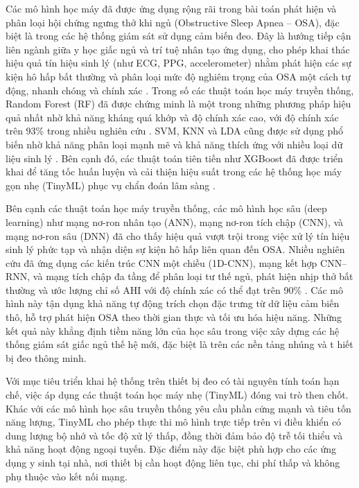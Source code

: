 Các mô hình học máy đã được ứng dụng rộng rãi trong bài toán phát hiện 
và phân loại hội chứng ngưng thở khi ngủ (Obstructive Sleep Apnea – OSA), 
đặc biệt là trong các hệ thống giám sát sử dụng cảm biến đeo. 
Đây là hướng tiếp cận liên ngành giữa y học giấc ngủ và trí tuệ nhân tạo ứng dụng, 
cho phép khai thác hiệu quả tín hiệu sinh lý (như ECG, PPG, accelerometer) 
nhằm phát hiện các sự kiện hô hấp bất thường và phân loại mức độ nghiêm trọng của 
OSA một cách tự động, nhanh chóng và chính xác \cite{osa_sanchez2025}. 
Trong số các thuật toán học máy truyền thống, Random Forest (RF) đã được chứng minh 
là một trong những phương pháp hiệu quả nhất nhờ khả năng kháng quá khớp và độ chính xác cao, 
với độ chính xác trên 93\% trong nhiều nghiên cứu \cite{genuer2020random,wang2023ml_wearable}. 
SVM, KNN và LDA cũng được sử dụng phổ biến nhờ khả năng phân loại mạnh mẽ và khả năng thích ứng 
với nhiều loại dữ liệu sinh lý \cite{cortes1995svm, cunningham2007knn, tharwat2017lda}. 
Bên cạnh đó, các thuật toán tiên tiến như XGBoost đã được triển khai để tăng tốc huấn luyện và 
cải thiện hiệu suất trong các hệ thống học máy gọn nhẹ (TinyML) 
phục vụ chẩn đoán lâm sàng \cite{chen2016xgboost}.

Bên cạnh các thuật toán học máy truyền thống, 
các mô hình học sâu (deep learning) như mạng nơ-ron nhân tạo (ANN), 
mạng nơ-ron tích chập (CNN), và mạng nơ-ron sâu (DNN) đã cho thấy hiệu quả vượt trội 
trong việc xử lý tín hiệu sinh lý phức tạp và nhận diện sự kiện hô hấp liên quan đến OSA. 
Nhiều nghiên cứu đã ứng dụng các kiến trúc CNN một chiều (1D-CNN), mạng kết hợp CNN–RNN,
và mạng tích chập đa tầng để phân loại tư thế ngủ, phát hiện nhịp thở bất thường và ước lượng chỉ 
số AHI với độ chính xác có thể đạt trên 90\% 
\cite{Vu2025SleepPosition,HOANG2025116309,Sleep_Posture_Detection}. 
Các mô hình này tận dụng khả năng tự động trích chọn đặc trưng từ dữ liệu cảm biến thô, 
hỗ trợ phát hiện OSA theo thời gian thực và tối ưu hóa hiệu năng. Những kết quả này khẳng định tiềm năng lớn của học sâu trong việc 
xây dựng các hệ thống giám sát giấc ngủ thế hệ mới, đặc biệt là trên các nền tảng nhúng và t
hiết bị đeo thông minh.

Với mục tiêu triển khai hệ thống trên thiết bị đeo có tài nguyên tính toán hạn chế, 
việc áp dụng các thuật toán học máy nhẹ (TinyML) đóng vai trò then chốt. 
Khác với các mô hình học sâu truyền thống yêu cầu phần cứng mạnh và 
tiêu tốn năng lượng, TinyML cho phép thực thi mô hình trực tiếp trên vi điều khiển 
có dung lượng bộ nhớ và tốc độ xử lý thấp, đồng thời đảm bảo độ trễ tối thiểu và khả năng 
hoạt động ngoại tuyến. Đặc điểm này đặc biệt phù hợp cho các ứng dụng y sinh tại nhà, 
nơi thiết bị cần hoạt động liên tục, chi phí thấp và không phụ thuộc vào kết nối mạng.

